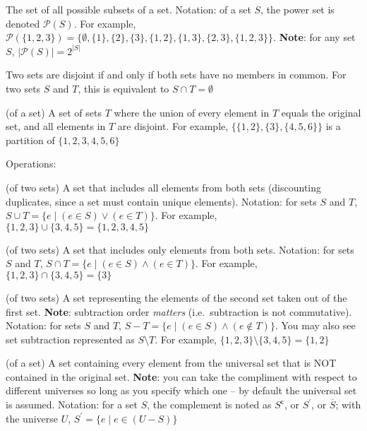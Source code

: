 \documentclass[main.tex]{subfiles}
\begin{document}
\begin{defn}
	The set of all possible subsets of a set. Notation: of a set \(S\), the power set is denoted \(\mathcal{P}(S)\). For example, \(\mathcal{P}(\{1,2,3\}) = \{\emptyset, \{1\}, \{2\}, \{3\}, \{1,2\}, \{1,3\}, \{2,3\}, \{1,2,3\}\}\). \textbf{Note}: for any set \(S\), \(|\mathcal{P}(S)| = 2^{|S|}\)
\end{defn}

\begin{defn}[Disjoint]
	Two sets are disjoint if and only if both sets have no members in common. For two sets \(S\) and \(T\), this is equivalent to \(S \cap T = \emptyset\)
\end{defn}

\begin{defn}[Partition]
	(of a set) A set of sets \(T\) where the union of every element in \(T\) equals the original set, and all elements in \(T\) are disjoint. For example, \(\{\{1,2\}, \{3\}, \{4,5,6\}\}\) is a partition of \(\{1,2,3,4,5,6\}\)
\end{defn}

Operations:

\begin{defn}[Union]
	(of two sets) A set that includes all elements from both sets (discounting duplicates, since a set must contain unique elements). Notation: for sets \(S\) and \(T\), \(S \cup T = \{e \mid (e \in S) \lor (e \in T)\}\). For example, \(\{1,2,3\} \cup \{3,4,5\} = \{1,2,3,4,5\}\)
\end{defn}

\begin{defn}[Intersection]
	(of two sets) A set that includes only elements from both sets. Notation: for sets \(S\) and \(T\), \(S \cap T = \{e \mid (e \in S) \land (e \in T)\}\). For example, \(\{1,2,3\} \cap \{3,4,5\} = \{3\}\)
\end{defn}

\begin{defn}[Subtraction]
	(of two sets) A set representing the elements of the second set taken out of the first set. \textbf{Note}: subtraction order \textit{matters} (i.e.\ subtraction is not commutative). Notation: for sets \(S\) and \(T\), \(S - T = \{e \mid (e \in S) \land (e \not\in T)\}\). You may also see set subtraction represented as \(S \setminus T\). For example, \(\{1,2,3\} \setminus \{3,4,5\} = \{1,2\}\)
\end{defn}

\begin{defn}[Compliment]
	(of a set) A set containing every element from the universal set that is NOT contained in the original set. \textbf{Note}: you can take the compliment with respect to different universes so long as you specify which one -- by default the universal set is assumed. Notation: for a set \(S\), the complement is noted as \(S^{\mathsf{c}}\), or \(S^{'}\), or \(\overline{S}\); with the universe \(U\), \(S^{'} = \{e \mid e \in (U - S)\}\)
\end{defn}
\end{document}
